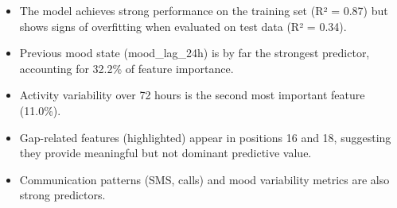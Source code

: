 \documentclass{article}
\begin{document}
\begin{itemize}
\item The model achieves strong performance on the training set (R² = 0.87) but shows signs of overfitting when evaluated on test data (R² = 0.34).
\item Previous mood state (mood\_lag\_24h) is by far the strongest predictor, accounting for 32.2\% of feature importance.
\item Activity variability over 72 hours is the second most important feature (11.0\%).
\item Gap-related features (highlighted) appear in positions 16 and 18, suggesting they provide meaningful but not dominant predictive value.
\item Communication patterns (SMS, calls) and mood variability metrics are also strong predictors.
\end{itemize}
\end{document}
